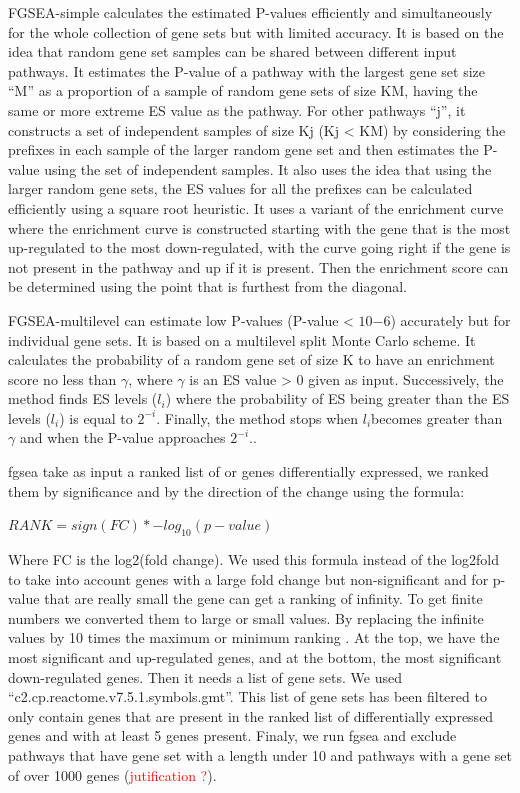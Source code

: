 \documentclass[a4paper, 11pt]{article}
\begin{document}
\begin{multicols}{2}
FGSEA-simple calculates the estimated P-values efficiently and simultaneously for the whole collection of gene sets but with limited accuracy. It is based on the idea that random gene set samples can be shared between different input pathways. It estimates the P-value of a pathway with the largest gene set size “M” as a proportion of a sample of random gene sets of size KM, having the same or more extreme ES value as the pathway. For other pathways “j”, it constructs a set of independent samples of size Kj (Kj < KM) by considering the prefixes in each sample of the larger random gene set and then estimates the P-value using the set of independent samples. It also uses the idea that using the larger random gene sets, the ES values for all the prefixes can be calculated efficiently using a square root heuristic. It uses a variant of the enrichment curve where the enrichment curve is constructed starting with the gene that is the most up-regulated to the most down-regulated, with the curve going right if the gene is not present in the pathway and up if it is present. Then the enrichment score can be determined using the point that is furthest from the diagonal.

FGSEA-multilevel can estimate low P-values (P-value < $10{-6}$) accurately but for individual gene sets. It is based on a multilevel split Monte Carlo scheme. It calculates the probability of a random gene set of size K to have an enrichment score no less than $\gamma$, where $\gamma$ is an ES value > 0 given as input. Successively, the method finds ES levels ($l_i$) where the probability of ES being greater than the ES levels ($l_i$) is equal to $2^{-i}$. Finally, the method stops when $ l_i $becomes greater than $\gamma$ and when the P-value approaches $2^{-i}$.\citep{korotkevich2016fast}.

fgsea take as input a ranked list of or genes differentially expressed, we ranked them by significance and by the direction of the change using the formula:
\bigskip

 $ RANK =sign(FC)* -log_{10}(p-value)  $
 
\bigskip
Where FC is the log2(fold change).
We used this formula instead of the log2fold to take into account genes with a large fold change but non-significant and for p-value that are really small the gene can get a ranking of infinity. To get finite numbers we converted them to large or small values. By replacing the infinite values by 10 times the maximum or minimum ranking .
 At the top, we have the most significant and up-regulated genes, and at the bottom, the most significant down-regulated genes. Then it needs a list of gene sets. We used “c2.cp.reactome.v7.5.1.symbols.gmt”. This list of gene sets has been filtered to only contain genes  that are present in the ranked list of differentially expressed genes and with at least 5 genes present. Finaly, we run fgsea  \citep{fgsea} and exclude pathways that have gene set with a length under 10 and pathways with a gene set of over 1000 genes (\textcolor{red} {jutification ?}).
 

\end{multicols}
\end{document}
